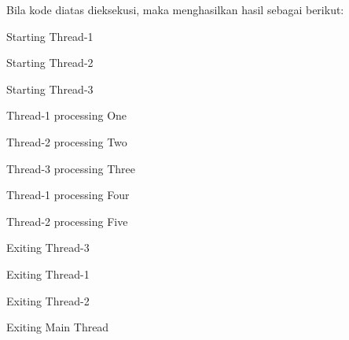 \documentclass [12pt,a4paper,notitlepage,oneside,bahasa]{article}
\begin{document}
Bila kode diatas dieksekusi, maka menghasilkan hasil sebagai berikut: \par
\vspace{12pt}
\noindent 
{\fontsize{10pt}{10pt}\selectfont Starting Thread-1} \par
\noindent 
{\fontsize{10pt}{10pt}\selectfont Starting Thread-2} \par
\noindent 
{\fontsize{10pt}{10pt}\selectfont Starting Thread-3} \par
\noindent 
{\fontsize{10pt}{10pt}\selectfont Thread-1 processing One} \par
\noindent 
{\fontsize{10pt}{10pt}\selectfont Thread-2 processing Two} \par
\noindent 
{\fontsize{10pt}{10pt}\selectfont Thread-3 processing Three} \par
\noindent 
{\fontsize{10pt}{10pt}\selectfont Thread-1 processing Four} \par
\noindent 
{\fontsize{10pt}{10pt}\selectfont Thread-2 processing Five} \par
\noindent 
{\fontsize{10pt}{10pt}\selectfont Exiting Thread-3} \par
\noindent 
{\fontsize{10pt}{10pt}\selectfont Exiting Thread-1} \par
\noindent 
{\fontsize{10pt}{10pt}\selectfont Exiting Thread-2} \par
\noindent 
{\fontsize{10pt}{10pt}\selectfont Exiting Main Thread} \par

\vspace{12pt}
\end{document}
